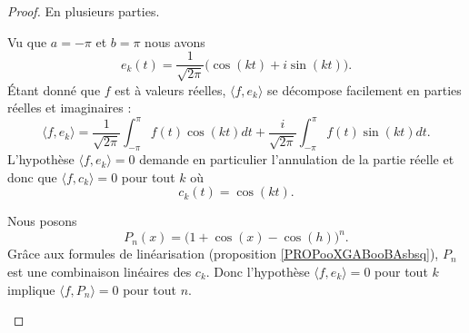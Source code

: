 \begin{proof}
	En plusieurs parties.
	\begin{subproof}
		\spitem[Trigonométrie]


		Vu que \( a=-\pi\) et \( b=\pi\) nous avons
		\begin{equation}
			e_k(t)=\frac{1}{ \sqrt{2\pi}}\big( \cos(kt)+i\sin(kt) \big).
		\end{equation}
		Étant donné que \( f\) est à valeurs réelles, \( \langle f, e_k \rangle\) se décompose facilement en parties réelles et imaginaires :
		\begin{equation}
			\langle f, e_k \rangle=\frac{1}{ \sqrt{2\pi}}\int_{-\pi}^{\pi}f(t)\cos(kt)dt+\frac{ i }{ \sqrt{2\pi} }\int_{-\pi}^{\pi}f(t)\sin(kt)dt.
		\end{equation}
		L'hypothèse \( \langle f, e_k \rangle=0\) demande en particulier l'annulation de la partie réelle et donc que \( \langle f, c_k \rangle=0\) pour tout \( k\) où
		\begin{equation}
			c_k(t)=\cos(kt).
		\end{equation}


		Nous posons
		\begin{equation}
			P_n(x)=\big( 1+\cos(x)-\cos(h) \big)^n.
		\end{equation}
		Grâce aux formules de linéarisation (proposition \ref{PROPooXGABooBAsbsq}), \( P_n\) est une combinaison linéaires des \( c_k\). Donc l'hypothèse \( \langle f, e_k \rangle=0\) pour tout \( k\) implique \( \langle f, P_n \rangle=0\) pour tout \( n\).



\end{subproof}
\end{proof}
